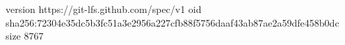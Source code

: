 version https://git-lfs.github.com/spec/v1
oid sha256:72304e35dc5b3fc51a3e2956a227cfb88f5756daaf43ab87ae2a59dfe458b0dc
size 8767
